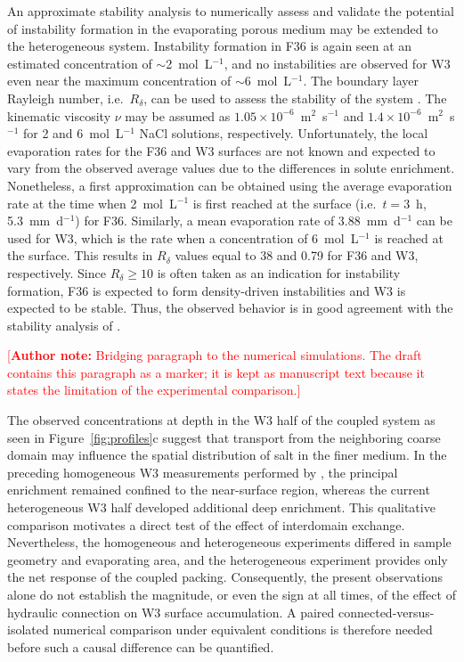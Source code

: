 \documentclass[final]{agujournal2019}
\newcommand{\authornote}[1]{%
  \par\noindent\textcolor{red}{\small[\textbf{Author note:} #1]}\par}
\begin{document}
An approximate stability analysis to numerically assess and validate the
potential of instability formation in the evaporating porous medium may be
extended to the heterogeneous system. Instability formation in F36 is again seen
at an estimated concentration of $\sim$2~mol~L$^{-1}$, and no instabilities are
observed for W3 even near the maximum concentration of $\sim$6~mol~L$^{-1}$. The
boundary layer Rayleigh number, i.e.\ $R_\delta$, can be used to assess the
stability of the system \cite{wooding1997a}. The kinematic viscosity
$\nu$ may be assumed as $1.05\times10^{-6}$~m$^2$~s$^{-1}$ and
$1.4\times10^{-6}$~m$^2$~s$^{-1}$ for 2 and 6~mol~L$^{-1}$ NaCl solutions,
respectively. Unfortunately, the local evaporation rates for the F36 and W3
surfaces are not known and expected to vary from the observed average values due
to the differences in solute enrichment. Nonetheless, a first approximation can
be obtained using the average evaporation rate at the time when
2~mol~L$^{-1}$ is first reached at the surface (i.e.\ $t=3$~h,
5.3~mm~d$^{-1}$) for F36. Similarly, a mean evaporation rate of
3.88~mm~d$^{-1}$ can be used for W3, which is the rate when a concentration of
6~mol~L$^{-1}$ is reached at the surface. This results in $R_\delta$ values
\cite{wooding1997a} equal to 38 and 0.79 for F36 and W3, respectively. Since
$R_\delta \ge 10$ is often taken as an indication for instability formation, F36
is expected to form density-driven instabilities and W3 is expected to be stable.
Thus, the observed behavior is in good agreement with the stability analysis of
.

\authornote{Bridging paragraph to the numerical simulations. The draft contains
this paragraph as a marker; it is kept as manuscript text because it states the
limitation of the experimental comparison.}

The observed concentrations at depth in the W3 half of the coupled system as
seen in Figure~\ref{fig:profiles}c suggest that transport from the neighboring
coarse domain may influence the spatial distribution of salt in the finer medium.
In the preceding homogeneous W3 measurements performed by ,
the principal enrichment remained confined to the near-surface region, whereas
the current heterogeneous W3 half developed additional deep enrichment. This
qualitative comparison motivates a direct test of the effect of interdomain
exchange. Nevertheless, the homogeneous and heterogeneous experiments differed
in sample geometry and evaporating area, and the heterogeneous experiment
provides only the net response of the coupled packing. Consequently, the present
observations alone do not establish the magnitude, or even the sign at all times,
of the effect of hydraulic connection on W3 surface accumulation. A paired
connected-versus-isolated numerical comparison under equivalent conditions is
therefore needed before such a causal difference can be quantified.
\end{document}
